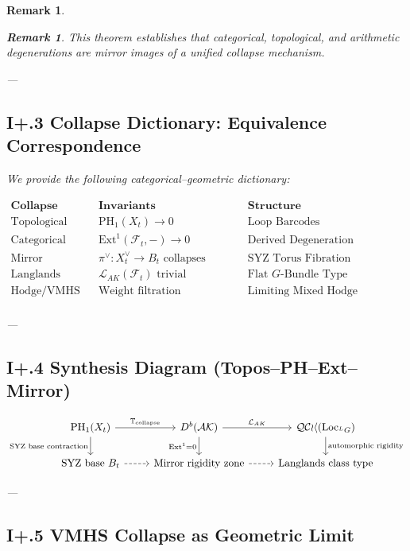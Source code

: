 \documentclass[11pt]{article}
\newtheorem{remark}[theorem]{Remark}
\begin{document}
\begin{remark}
\begin{remark}
This theorem establishes that categorical, topological, and arithmetic degenerations are mirror images of a unified collapse mechanism.
\end{remark}

---

\subsection*{I+.3 Collapse Dictionary: Equivalence Correspondence}

We provide the following categorical–geometric dictionary:

\[
\begin{array}{lll}
\textbf{Collapse Type} & \textbf{Invariants} & \textbf{Structure} \\
\hline
\text{Topological} & \mathrm{PH}_1(X_t) \to 0 & \text{Loop Barcodes} \\
\text{Categorical} & \mathrm{Ext}^1(\mathcal{F}_t, -) \to 0 & \text{Derived Degeneration} \\
\text{Mirror} & \pi^\vee: X_t^\vee \to B_t \text{ collapses} & \text{SYZ Torus Fibration} \\
\text{Langlands} & \mathcal{L}_{AK}(\mathcal{F}_t) \text{ trivial} & \text{Flat } G\text{-Bundle Type} \\
\text{Hodge/VMHS} & \text{Weight filtration degenerates} & \text{Limiting Mixed Hodge Structure} \\
\end{array}
\]

---

\subsection*{I+.4 Synthesis Diagram (Topos–PH–Ext–Mirror)}

\[
\begin{tikzcd}
\mathrm{PH}_1(X_t) \arrow[r, "\mathbb{T}_{\text{collapse}}"] \arrow[d, "\text{SYZ base contraction}"'] &
D^b(\mathcal{AK}) \arrow[r, "\mathcal{L}_{AK}"] \arrow[d, "\mathrm{Ext}^1 = 0"'] &
\mathcal{QCoh}(\mathrm{Loc}_{^LG}) \arrow[d, "\text{automorphic rigidity}"] \\
\text{SYZ base } B_t \arrow[r, dashed] &
\text{Mirror rigidity zone} \arrow[r, dashed] &
\text{Langlands class type}
\end{tikzcd}
\]

---

\subsection*{I+.5 VMHS Collapse as Geometric Limit}


\end{remark}
\end{document}

